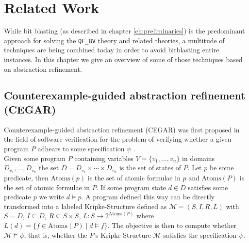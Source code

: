 \chapter{Related Work}
\label{ch:related_work}
While bit blasting (as described in chapter \ref{ch:preliminaries}) is the predominant approach for solving the \texttt{QF\_BV} theory and related theories, a multitude of techniques are being combined today in order to avoid bitblasting entire instances.
In this chapter we give an overview of some of those techniques based on abstraction refinement.

\section{Counterexample-guided abstraction refinement (CEGAR)}
Counterexample-guided abstraction refinement (CEGAR) was first proposed in the field of software verification for the problem of verifying whether a given program $P$ adhears to some specification $\psi$ \cite{CEGAR}.\\
Given some program $P$ containing variables $V=\{v_1,\dots,v_n\}$ in domains $D_{v_1},\dots,D_{v_n}$ the set $D=D_{v_1}\times\dotsi\times D_{v_n}$ is the set of states of $P$. Let $p$ be some predicate, then $\text{Atoms}\left(p\right)$ is the set of atomic formulae in $p$ and $\text{Atoms}\left(P\right)$ is the set of atomic formulae in $P$. If some program state $d\in D$ satisfies some predicate $p$ we write $d\vDash p$. A program defined this way can be directly transformed into a labeled Kripke-Structure defined as $\mathcal{M}=\left(S,I,R,L\right)$ with $S=D$, $I\subseteq D$, $R \subseteq S \times S$, $L\colon S \to 2^{\text{Atoms}\left(P\right)}$ where $L\left(d\right) = \{ f \in \text{Atoms}\left(P\right) \mid d \vDash f \}$. The objective is then to compute whether $\mathcal{M}\vDash\psi$, that is, whether the $P$'s Kripke-Structure $\mathcal{M}$ satisfies the specification $\psi$.
